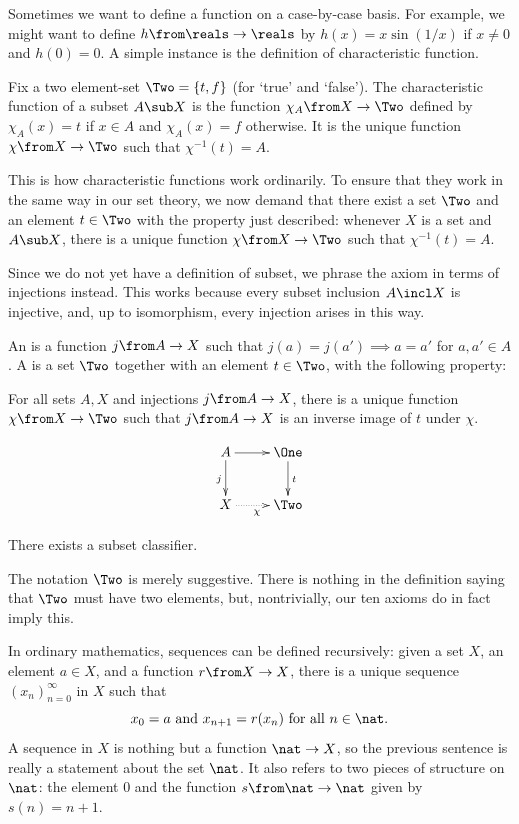 \documentclass[12pt]{article}
\begin{document}
% 
Sometimes we want to define a function on a case-by-case basis.  For
example, we might want to define $h\from \reals \to \reals$ by $h(x) = x
\sin(1/x)$ if $x \neq 0$ and $h(0) = 0$.  A simple instance is the
definition of characteristic function.

Fix a two element-set $\Two = \{t, f\}$ (for `true' and `false').  The
characteristic function of a subset $A \sub X$ is the function $\chi_A
\from X \to \Two$ defined by $\chi_A(x) = t$ if $x \in A$ and $\chi_A(x)
= f$ otherwise.  It is the unique function $\chi\from X \to \Two$ such
that $\chi^{-1}(t) = A$.  

This is how characteristic functions work ordinarily.  To ensure that they
work in the same way in our set theory, we now demand that there exist a
set $\Two$ and an element $t \in \Two$ with the property just described:
whenever $X$ is a set and $A \sub X$, there is a unique function $\chi\from
X \to \Two$ such that $\chi^{-1}(t) = A$.

Since we do not yet have a definition of subset, we phrase the axiom in
terms of injections instead.  This works because every subset inclusion $A
\incl X$ is injective, and, up to isomorphism, every injection arises in
this way.

\begin{dfn}
An  is a function $j \from A \to X$ such that $j(a) =
j(a') \implies a = a'$ for $a, a' \in A$. A  is a set $\Two$ together with an element $t \in
\Two$, with the following property:

\medskip\noindent
For all sets $A, X$ and injections $j\from A \to X$,
there is a unique function $\chi\from X \to \Two$ such that
$j\from A \to X$ is an inverse image of $t$ under $\chi$.
\end{dfn}
\[
\xymatrix{
A \ar[r] \ar[d]_j       &\One \ar[d]^t  \\
X \ar@{.>}[r]_\chi      &\Two
}
\]
% 
\begin{axiom}
There exists a subset classifier.
\end{axiom}
The notation $\Two$ is merely suggestive.  There is nothing in the
definition saying that $\Two$ must have two elements, but, nontrivially,
our ten axioms do in fact imply this.


% 
In ordinary mathematics, sequences can be defined recursively: given a set
$X$, an element $a \in X$, and a function $r \from X \to X$, there is a
unique sequence $(x_n)_{n = 0}^\infty$ in $X$ such that
\[
x_0 = a
\text{ and }
x_{n + 1} = r(x_n) 
\text{ for all } n \in \nat.
\]
A sequence in $X$ is nothing but a function $\nat \to X$, so the previous
sentence is really a statement about the set $\nat$.  It also refers to two
pieces of structure on $\nat$: the element $0$ and the function $s\from
\nat \to \nat$ given by $s(n) = n + 1$.
\end{document}
